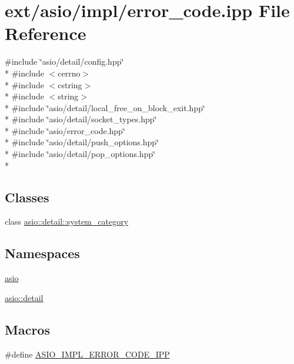 \hypertarget{error__code_8ipp}{}\section{ext/asio/impl/error\+\_\+code.ipp File Reference}
\label{error__code_8ipp}
{\ttfamily \#include \char`\"{}asio/detail/config.\+hpp\char`\"{}}\\*
{\ttfamily \#include $<$cerrno$>$}\\*
{\ttfamily \#include $<$cstring$>$}\\*
{\ttfamily \#include $<$string$>$}\\*
{\ttfamily \#include \char`\"{}asio/detail/local\+\_\+free\+\_\+on\+\_\+block\+\_\+exit.\+hpp\char`\"{}}\\*
{\ttfamily \#include \char`\"{}asio/detail/socket\+\_\+types.\+hpp\char`\"{}}\\*
{\ttfamily \#include \char`\"{}asio/error\+\_\+code.\+hpp\char`\"{}}\\*
{\ttfamily \#include \char`\"{}asio/detail/push\+\_\+options.\+hpp\char`\"{}}\\*
{\ttfamily \#include \char`\"{}asio/detail/pop\+\_\+options.\+hpp\char`\"{}}\\*
\subsection*{Classes}
\begin{DoxyCompactItemize}
\item 
class \hyperlink{classasio_1_1detail_1_1system__category}{asio\+::detail\+::system\+\_\+category}
\end{DoxyCompactItemize}
\subsection*{Namespaces}
\begin{DoxyCompactItemize}
\item 
 \hyperlink{namespaceasio}{asio}
\item 
 \hyperlink{namespaceasio_1_1detail}{asio\+::detail}
\end{DoxyCompactItemize}
\subsection*{Macros}
\begin{DoxyCompactItemize}
\item 
\#define \hyperlink{error__code_8ipp_a5dbf4995fa61bbf3ba7341975e7379ab}{A\+S\+I\+O\+\_\+\+I\+M\+P\+L\+\_\+\+E\+R\+R\+O\+R\+\_\+\+C\+O\+D\+E\+\_\+\+I\+P\+P}
\end{DoxyCompactItemize}
